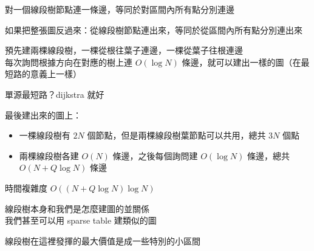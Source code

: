 \begin{frame}{\ectitle}
{\begin{figure}[h!]
\begin{center}
        \end{center}
    \end{figure}
    }
\end{frame}

\begin{frame}{\ectitle}
    對一個線段樹節點連一條邊，等同於對區間內所有點分別連邊
    
    如果把整張圖反過來：從線段樹節點連出來，等同於從區間內所有點分別連出來
\end{frame}

\begin{frame}{\ectitle}
    預先建兩棵線段樹，一棵從根往葉子連邊，一棵從葉子往根連邊 \\
    每次詢問根據方向在對應的樹上連 $O(\log N)$ 條邊，就可以建出一樣的圖（在最短路的意義上一樣）

    單源最短路？dijkstra 就好
\end{frame}

\begin{frame}{\ectitle}
    最後建出來的圖上：
    \begin{itemize}
        \item 一棵線段樹有 $2N$ 個節點，但是兩棵線段樹葉節點可以共用，總共 $3N$ 個點
        \item 兩棵線段樹各建 $O(N)$ 條邊，之後每個詢問建 $O(\log N)$ 條邊，總共 $O(N + Q \log N)$ 條邊
    \end{itemize}
    時間複雜度 $O((N + Q \log N) \log N)$
\end{frame}

\begin{frame}{\ectitle}
    線段樹本身和我們是怎麼建圖的並關係 \\
    我們甚至可以用 sparse table 建類似的圖

    線段樹在這裡發揮的最大價值是成一些特別的小區間
\end{frame}
